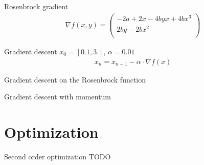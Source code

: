 \documentclass{beamer}
\begin{document}
    \begin{frame}{Rosenbrock gradient}
      \begin{align}
        \nabla f(x, y) = \begin{pmatrix}
          -2a + 2x - 4byx + 4bx^3 \\
          2by - 2bx^2 \\
        \end{pmatrix}
      \end{align}
    \end{frame}

    \begin{frame}{Gradient descent}
      $x_0 = [0.1, 3.]$,
      $\alpha = 0.01 $
      \begin{align}
        x_n = x_{n-1} - \alpha \cdot \nabla f(x)
      \end{align}
    \end{frame}

    \begin{frame}{Gradient descent on the Rosenbrock function}
      \centering
    \end{frame}

    \begin{frame}{Gradient descent with momentum}
      \centering
    \end{frame}

    \section{Optimization}
    \begin{frame}{Second order optimization}
        TODO
    \end{frame}
\end{document}
